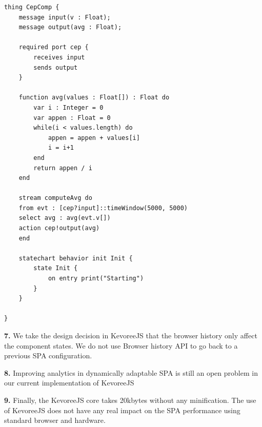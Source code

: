 \begin{lstlisting}[language=ThingML]
thing CepComp {
	message input(v : Float);
	message output(avg : Float);
	
	required port cep {
		receives input
		sends output	
	}
	
	function avg(values : Float[]) : Float do
		var i : Integer = 0
		var appen : Float = 0
		while(i < values.length) do
			appen = appen + values[i]
			i = i+1
		end
		return appen / i
	end
	
	stream computeAvg do
	from evt : [cep?input]::timeWindow(5000, 5000)
	select avg : avg(evt.v[])
	action cep!output(avg)
	end
	
	statechart behavior init Init {
		state Init {
			on entry print("Starting")			
		}
	}
	
}
\end{lstlisting}



\indent \textbf{7.} We take the design decision in KevoreeJS that the browser history only affect the component states. We do not use Browser history API to go back to a previous SPA configuration.

\indent \textbf{8.} Improving analytics in dynamically adaptable SPA is still an open problem in our current implementation of KevoreeJS

\indent \textbf{9.} Finally, the KevoreeJS core takes 20kbytes without any minification. The use of KevoreeJS does not have any real impact on the SPA performance using standard browser and hardware.

